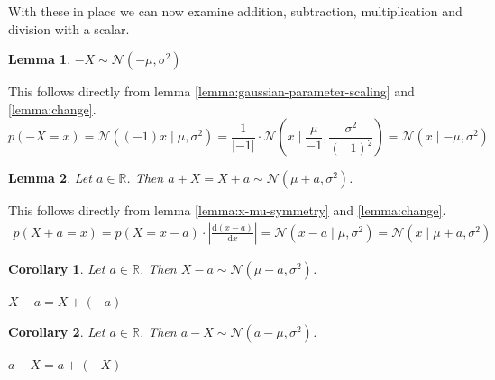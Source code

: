 \documentclass[11pt,a4paper]{book}
\newtheorem{lemma}{Lemma}
\newtheorem*{corollary}{Corollary}
\begin{document}
With these in place we can now examine addition, subtraction, multiplication and
division with a scalar.

\vspace{1em}

\begin{lemma}
  $-X \sim \mathcal{N}(-\mu, \sigma^{2})$
\end{lemma}
\begin{proof2}
  This follows directly from lemma \ref{lemma:gaussian-parameter-scaling} and
  \ref{lemma:change}.
  \begin{equation*}
    p(-X = x) = \mathcal{N}((-1)x \mid \mu, \sigma^{2}) = \frac{1}{|{-1}|} \cdot \mathcal{N}\left( x \mid \frac{\mu}{{-1}}, \frac{\sigma^{2}}{({-1})^{2}} \right) = \mathcal{N}(x \mid {-\mu}, \sigma^{2})
  \end{equation*}
\end{proof2}

\begin{lemma}
  Let $a \in \mathbb{R}$. Then
  $a + X = X + a \sim \mathcal{N}(\mu + a, \sigma^{2})$.
\end{lemma}
\begin{proof2}
  This follows directly from lemma \ref{lemma:x-mu-symmetry} and
  \ref{lemma:change}.
  \begin{align*}
    p(X + a = x) = p(X = x - a) \cdot \left| \frac{\mathrm{d}(x - a)}{\mathrm{d}x} \right| = \mathcal{N}(x - a \mid \mu, \sigma^{2}) = \mathcal{N}(x \mid \mu + a, \sigma^{2})
  \end{align*}
\end{proof2}

\begin{corollary}
  Let $a \in \mathbb{R}$. Then $X - a \sim \mathcal{N}(\mu - a, \sigma^{2})$.
\end{corollary}
\begin{proof2}
  $X - a = X + (-a)$
\end{proof2}

\begin{corollary}
  Let $a \in \mathbb{R}$. Then $a - X \sim \mathcal{N}(a - \mu, \sigma^{2})$.
\end{corollary}
\begin{proof2}
  $a - X = a + (-X)$
\end{proof2}
\end{document}
